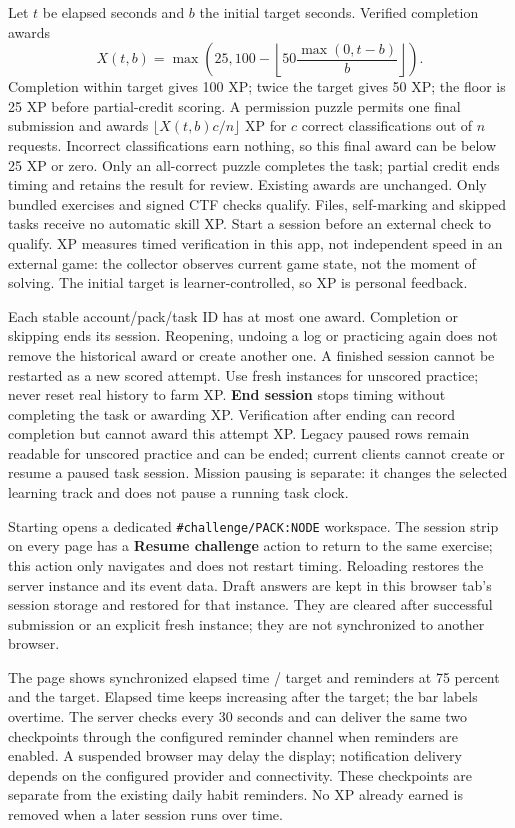 Let $t$ be elapsed seconds and $b$ the initial target seconds. Verified
completion awards
\[
 X(t,b)=\max\left(25,100-\left\lfloor50\frac{\max(0,t-b)}{b}\right\rfloor\right).
\]
Completion within target gives 100 XP; twice the target gives 50 XP; the floor is
25 XP before partial-credit scoring. A permission puzzle permits one final
submission and awards $\lfloor X(t,b)c/n\rfloor$ XP for $c$ correct classifications
out of $n$ requests. Incorrect classifications earn nothing, so this final award
can be below 25 XP or zero. Only an all-correct puzzle completes the task; partial
credit ends timing and retains the result for review. Existing awards are unchanged.
Only bundled exercises and signed CTF checks qualify. Files, self-marking
and skipped tasks receive no automatic skill XP. Start a session before an external
check to qualify. XP measures timed verification in this app, not independent speed
in an external game: the collector observes current game state, not the moment of
solving. The initial target is learner-controlled, so XP is personal feedback.

Each stable account/pack/task ID has at most one award. Completion or skipping ends
its session. Reopening, undoing a log or practicing again does not remove the historical
award or create another one. A finished session cannot be restarted as a new scored
attempt. Use fresh instances for unscored practice; never reset real history to farm XP.
\textbf{End session} stops timing without completing the task or awarding XP.
Verification after ending can record completion but cannot award this attempt XP.
Legacy paused rows remain readable for unscored practice and can be ended; current
clients cannot create or resume a paused task session. Mission pausing is separate:
it changes the selected learning track and does not pause a running task clock.

Starting opens a dedicated \texttt{\#challenge/PACK:NODE} workspace. The session strip
on every page has a \textbf{Resume challenge} action to return to the same exercise;
this action only navigates and does not restart timing. Reloading restores the server
instance and its event data. Draft answers are kept in this browser tab's session
storage and restored for that instance. They are cleared after successful submission
or an explicit fresh instance; they are not synchronized to another browser.

The page shows synchronized elapsed time / target and reminders at 75 percent and
the target. Elapsed time keeps increasing after the target; the bar labels overtime.
The server checks every 30 seconds and can deliver the same two checkpoints through
the configured reminder channel when reminders are enabled. A suspended browser may
delay the display; notification delivery depends on the configured provider and
connectivity. These checkpoints are separate from the existing daily habit reminders.
No XP already earned is removed when a later session runs over time.

